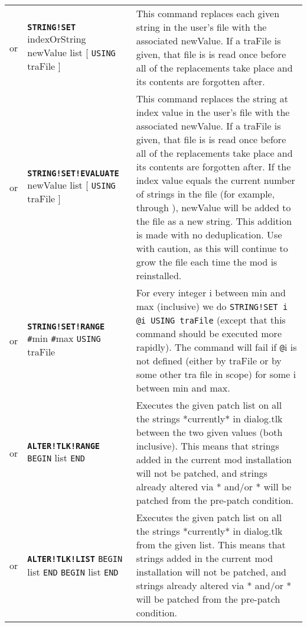 \documentclass{article}
\def\ttref#1{\ahrefloc{#1}{\tt #1}}
\def\DEFINE#1{{\tt \bf #1}\label{#1}\index{#1}}
\def\t#1{{\tt #1}}
\def\Slist{{\color{red} list }}
\def\Ob{{\color{red} [ }}
\def\Oe{{\color{red} ] }}
\begin{document}
\begin{tabular}{cp{10in}|p{10in}}
  or & \DEFINE{STRING!SET} indexOrString newValue \Slist
    \Ob \t{USING} traFile \Oe &
    This command replaces each given string in the user's \ttref{TLK} file
    with the associated newValue. If a
    traFile is given, that file is is read once before all of the
    replacements take place and its contents are forgotten after.  \\

  or & \DEFINE{STRING!SET!EVALUATE} \ttref{value} newValue \Slist
    \Ob \t{USING} traFile \Oe &
    This command replaces the string at index value in the user's
    \ttref{TLK} file with the associated newValue. If a traFile is
    given, that file is is read once before all of the replacements
    take place and its contents are forgotten after. If the index
    value equals the current number of strings in the \ttref{TLK} file
    (for example, through \ttref{NEXT!STRREF}), newValue will be added
    to the \ttref{TLK} file as a new string. This addition is made with
    no deduplication. Use with caution, as this will continue to grow
    the \ttref{TLK} file each time the mod is reinstalled.
    \\

  or & \DEFINE{STRING!SET!RANGE} \t{\#}min \t{\#}max \t{USING} traFile &
    For every integer i between min and max (inclusive) we do
    \t{STRING!SET i @i USING traFile} (except that this command should be
    executed more rapidly). The command will fail if \t{@}i is not defined
    (either by traFile or by some other tra file in scope) for some i
    between min and max.  \\

	or & \DEFINE{ALTER!TLK!RANGE} \ttref{value} \ttref{value} \t{BEGIN} \ttref{patch} \Slist \t{END} &
		Executes the given patch list on all the strings *currently* in dialog.tlk between the
		two given values (both inclusive).
		This means that strings added in the current mod installation will not
		be patched, and strings already altered via \ttref{ALTER!TLK}* and/or \ttref{STRING!SET}*
		will be patched from the pre-patch condition.\\

or & \DEFINE{ALTER!TLK!LIST} \t{BEGIN} \ttref{value} \Slist \t{END} \t{BEGIN} \ttref{patch} \Slist \t{END} &
		Executes the given patch list on all the strings *currently* in dialog.tlk from the given list.
		This means that strings added in the current mod installation will not
		be patched, and strings already altered via \ttref{ALTER!TLK}* and/or \ttref{STRING!SET}*
		will be patched from the pre-patch condition. \\


\end{tabular}
\end{document}

